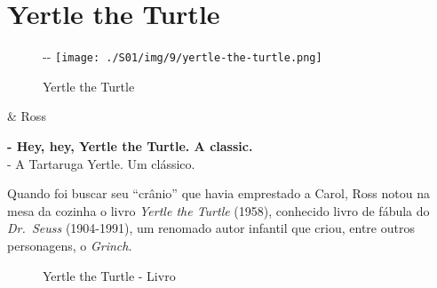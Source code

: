 \hypertarget{yertle-the-turtle}{%
\section{Yertle the Turtle}\label{yertle-the-turtle}}

\begin{figure}[!ht]
  \begin{adjustwidth}{-\oddsidemargin-1in}{-\rightmargin}
    \centering
    \texttt{[image: ./S01/img/9/yertle-the-turtle.png]}
    \caption{Yertle the Turtle\label{fig:yertle-the-turtle}}
  \end{adjustwidth}
\end{figure}

\begin{tcolorbox}[enhanced,center upper,
    drop fuzzy shadow southeast, boxrule=0.3pt,
    lower separated=false,
    colframe=black!30!dialogoBorder,colback=white]
\begin{minipage}[c]{0.16\linewidth}
   & \centering \scriptsize{Ross}
\end{minipage}
\hfill
\begin{minipage}[c]{0.8\linewidth}
  \textbf{- Hey, hey, Yertle the Turtle. A classic.}\\
  - A Tartaruga Yertle. Um clássico.
\end{minipage}
\end{tcolorbox}

Quando foi buscar seu ``crânio'' que havia emprestado a Carol, Ross
notou na mesa da cozinha o livro \emph{Yertle the Turtle} (1958),
conhecido livro de fábula do \emph{Dr.~Seuss} (1904-1991), um renomado
autor infantil que criou, entre outros personagens, o \emph{Grinch}.

\begin{figure}
  \centering
    \caption{Yertle the Turtle - Livro\label{fig:yertle-the-turtle-livro}}
\end{figure}

